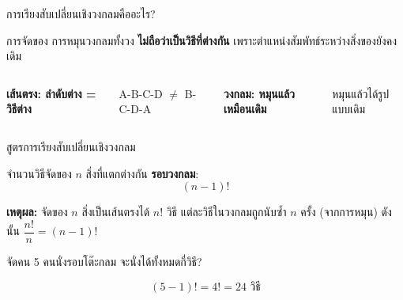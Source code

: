 \documentclass[11pt, aspectratio=169]{beamer}
\begin{document}
\begin{frame}{การเรียงสับเปลี่ยนเชิงวงกลมคืออะไร?}
  \begin{explanation}[แนวคิด]
    การจัดของ  การหมุนวงกลมทั้งวง \textbf{ไม่ถือว่าเป็นวิธีที่ต่างกัน}
    เพราะตำแหน่งสัมพัทธ์ระหว่างสิ่งของยังคงเดิม
  \end{explanation}

  \begin{columns}[T]
      \centering
      \textbf{เส้นตรง: ลำดับต่าง = วิธีต่าง}

      \medskip

      A-B-C-D $\neq$ B-C-D-A

      \centering
      \textbf{วงกลม: หมุนแล้วเหมือนเดิม}

      \medskip

      หมุนแล้วได้รูปแบบเดิม
  \end{columns}
\end{frame}

\begin{frame}{สูตรการเรียงสับเปลี่ยนเชิงวงกลม}
  \begin{explanation}[สูตร]
    จำนวนวิธีจัดของ $n$ สิ่งที่แตกต่างกัน \textbf{รอบวงกลม}:
    \[
      (n-1)!
    \]

    \textbf{เหตุผล:} จัดของ $n$ สิ่งเป็นเส้นตรงได้ $n!$ วิธี
    แต่ละวิธีในวงกลมถูกนับซํ้า $n$ ครั้ง (จากการหมุน)
    ดังนั้น $\dfrac{n!}{n} = (n-1)!$
  \end{explanation}

  \begin{exambox}
    จัดคน 5 คนนั่งรอบโต๊ะกลม จะนั่งได้ทั้งหมดกี่วิธี?

    \medskip
    \[
      (5-1)! = 4! = 24 \text{ วิธี}
    \]
  \end{exambox}
\end{frame}
\end{document}
